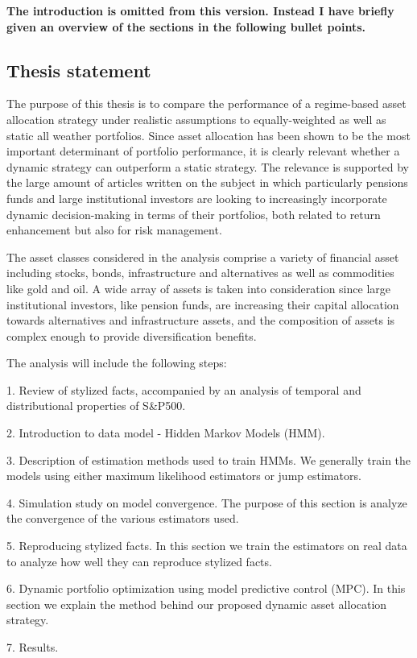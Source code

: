 \textbf{The introduction is omitted from this version. Instead I have briefly given an overview of the sections in the following bullet points.}

\subsection{Thesis statement}
The purpose of this thesis is to compare the performance of a regime-based asset allocation strategy under realistic assumptions to equally-weighted as well as static all weather portfolios. Since asset allocation has been shown to be the most important determinant of portfolio performance, it is clearly relevant whether a dynamic strategy can outperform a static strategy. The relevance is supported by the large amount of articles written on the subject in which particularly pensions funds and large institutional investors are looking to increasingly incorporate dynamic decision-making in terms of their portfolios, both related to return enhancement but also for risk management.

The asset classes considered in the analysis comprise a variety of financial asset including stocks, bonds, infrastructure and alternatives as well as commodities like gold and oil. A wide array of assets is taken into consideration since large institutional investors, like pension funds, are increasing their capital allocation towards alternatives and infrastructure assets, and the composition of assets is complex enough to provide diversification benefits. 

The analysis will include the following steps:

1. Review of stylized facts, accompanied by an analysis of temporal and distributional properties of S\&P500.

2. Introduction to data model - Hidden Markov Models (HMM).

3. Description of estimation methods used to train HMMs. We generally train the models using either maximum likelihood estimators or jump estimators.

4. Simulation study on model convergence. The purpose of this section is analyze the convergence of the various estimators used.

5. Reproducing stylized facts. In this section we train the estimators on real data to analyze how well they can reproduce stylized facts.

6. Dynamic portfolio optimization using model predictive control (MPC). In this section we explain the method behind our proposed dynamic asset allocation strategy.

7. Results.


